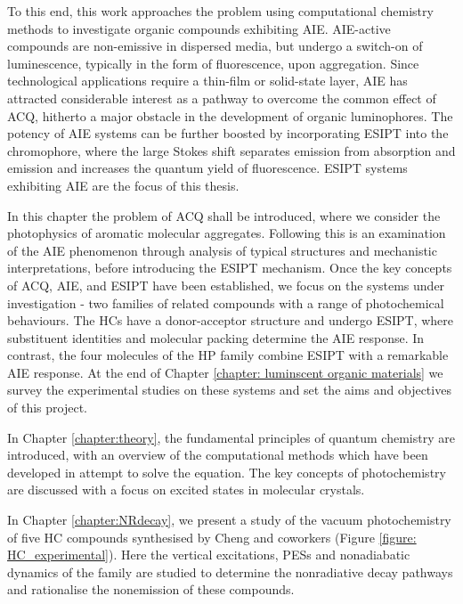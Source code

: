 To this end, this work approaches the problem using computational chemistry methods to investigate organic compounds exhibiting \ac{AIE}. AIE-active compounds are non-emissive in dispersed media, but undergo a switch-on of luminescence, typically in the form of fluorescence, upon aggregation. Since technological applications require a thin-film or solid-state layer, AIE has attracted considerable interest as a pathway to overcome the common effect of \ac{ACQ}, hitherto a major obstacle in the development of organic luminophores. The potency of \ac{AIE} systems can be further boosted by incorporating \acf{ESIPT} into the chromophore, where the large Stokes shift separates emission from absorption and emission and increases the quantum yield of fluorescence. ESIPT systems exhibiting AIE are the focus of this thesis. 

In this chapter the problem of \ac{ACQ} shall be introduced, where we consider the photophysics of aromatic molecular aggregates. Following this is an examination of the \ac{AIE} phenomenon through analysis of typical structures and mechanistic interpretations, before introducing the \ac{ESIPT} mechanism. Once the key concepts of \ac{ACQ}, \ac{AIE}, and \ac{ESIPT} have been established, we focus on the systems under investigation - two families of related compounds with a range of photochemical behaviours. The \acp{HC} have a donor-acceptor structure and undergo \ac{ESIPT}, where substituent identities and molecular packing determine the AIE response. In contrast, the four molecules of the \ac{HP} family combine \ac{ESIPT} with a remarkable \ac{AIE} response. At the end of Chapter \ref{chapter: luminscent organic materials} we survey the experimental studies on these systems and set the aims and objectives of this project. 

In Chapter \ref{chapter:theory}, the fundamental principles of quantum chemistry are introduced, with an overview of the computational methods which have been developed in attempt to solve the \schro{} equation. The key concepts of photochemistry are discussed with a focus on excited states in molecular crystals.

In Chapter \ref{chapter:NRdecay}, we present a study of the vacuum photochemistry of five \ac{HC} compounds synthesised by Cheng and coworkers (Figure \ref{figure: HC_experimental}). Here the vertical excitations, \acp{PES} and nonadiabatic dynamics of the family are studied to determine the nonradiative decay pathways and rationalise the nonemission of these compounds.

